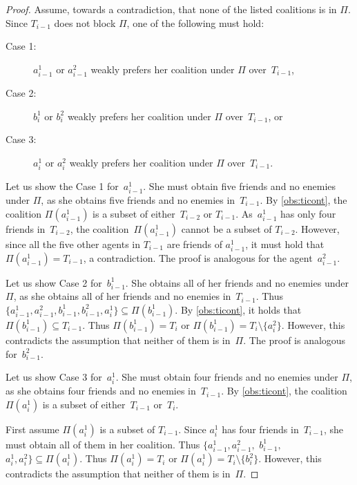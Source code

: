 \documentclass[a4paper,fleqn]{cas-sc}
\newcommand{\partition}{\ensuremath{\Pi}\xspace}
\begin{document}
{\begin{proof}
Assume, towards a contradiction, that none of the listed coalitions is in \partition.
Since $T_{i - 1}$ does not block $\partition$, one of the following must hold:
\begin{description}
\item[Case 1:] $a^1_{i - 1}$ or $a^2_{i - 1}$ weakly prefers her coalition under \partition over~$T_{i - 1}$,
\item[Case 2:] $b^1_{i}$ or $b^2_{i}$ weakly prefers her coalition under \partition over~$T_{i - 1}$, or
\item[Case 3:]$a^1_{i}$ or $a^2_{i}$ weakly prefers her coalition under \partition over~$T_{i - 1}$.
\end{description}
Let us show the Case 1 for~$a^1_{i - 1}$.
She must obtain five friends and no enemies under \partition, as she obtains five friends and no enemies in~$T_{i-1}$.
By \cref{obs:ticont}, the coalition $\partition(a^1_{i - 1})$  is a subset of either~$T_{i-2}$ or $T_{i-1}$. As~$a^1_{i - 1}$  has only four friends in~$T_{i-2}$, the coalition~$\partition(a^1_{i - 1})$  cannot be a subset of $T_{i-2}$.
However, since all the five other agents in $T_{i-1}$ are friends of $a^1_{i - 1}$, it must hold that $\partition(a^1_{i - 1}) = T_{i-1}$, a contradiction.
The proof is analogous for the agent~$a^2_{i - 1}$.

Let us show Case 2 for~$b^1_{i - 1}$.
She obtains all of her friends and no enemies under \partition, as she obtains all of her friends and no enemies in~$T_{i-1}$.
Thus $\{a^1_{i - 1}, a^2_{i - 1}, b^1_{i - 1}, b^2_{i - 1}, a^1_i\} \subseteq \partition(b^1_{i - 1})$. By \cref{obs:ticont}, it holds that $\partition(b^1_{i - 1}) \subseteq T_{i - 1}$. Thus $\partition(b^1_{i-1}) = T_i$ or $\partition(b^1_{i-1}) = T_i \setminus \{a^2_i\}$. However, this contradicts the assumption that neither of them is in~\partition. 
The proof is analogous for~$b^2_{i - 1}$.

Let us show Case 3 for~$a^1_{i}$.
She  must obtain four friends and no enemies under \partition, as she obtains four friends and no enemies in~$T_{i-1}$.
By \cref{obs:ticont}, the coalition~$\partition(a^1_{i})$ is a subset of either~$T_{i-1}$ or~$T_{i}$. 

First assume $\partition(a^1_{i})$ is a subset of $T_{i-1}$. Since $a^1_i$ has four friends in~$T_{i-1}$, she must obtain all of them in her coalition.
Thus $\{a^1_{i - 1}, a^2_{i - 1},$ $b^1_{i - 1},$ $a^1_i, a^2_i\} \subseteq \partition(a^1_{i})$.  Thus $\partition(a^1_{i}) = T_i$ or $\partition(a^1_{i}) = T_i \setminus \{b^2_i\}$. However, this contradicts the assumption that neither of them is in~\partition. 


\end{proof}}
\end{document}
